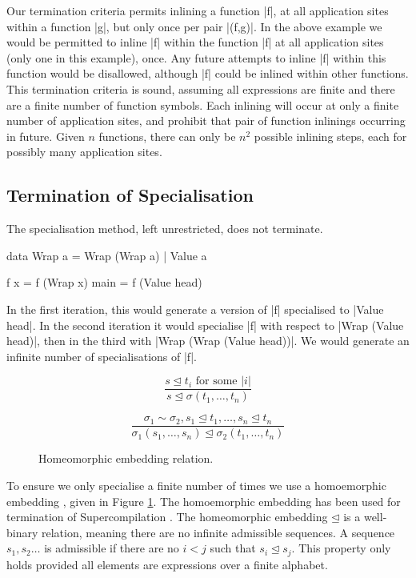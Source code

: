 \documentclass[preprint]{sigplanconf}
\begin{document}
Our termination criteria permits inlining a function |f|, at all application sites within a function |g|, but only once per pair |(f,g)|. In the above example we would be permitted to inline |f| within the function |f| at all application sites (only one in this example), once. Any future attempts to inline |f| within this function would be disallowed, although |f| could be inlined within other functions. This termination criteria is sound, assuming all expressions are finite and there are a finite number of function symbols. Each inlining will occur at only a finite number of application sites, and prohibit that pair of function inlinings occurring in future. Given $n$ functions, there can only be $n^2$ possible inlining steps, each for possibly many application sites.


\subsection{Termination of Specialisation}

The specialisation method, left unrestricted, does not terminate.

\begin{example}
\begin{code}
data Wrap a  =  Wrap (Wrap a)
             |  Value a

f x = f (Wrap x)
main = f (Value head)
\end{code}

In the first iteration, this would generate a version of |f| specialised to |Value head|. In the second iteration it would specialise |f| with respect to |Wrap (Value head)|, then in the third with |Wrap (Wrap (Value head))|. We would generate an infinite number of specialisations of |f|.
\end{example}

\begin{figure}
\[\frac{s \unlhd t_i \text{ for some } |i|}{s \unlhd \sigma(t_1,\ldots,t_n)} \]

\[\frac{\sigma_1 \sim \sigma_2,
        s_1 \unlhd t_1, \ldots , s_n \unlhd t_n}
       {\sigma_1 (s_1,\ldots,s_n) \unlhd \sigma_2 (t_1,\ldots,t_n)} \]
\caption{Homeomorphic embedding relation.}
\label{fig:homeomorphic}
\end{figure}

To ensure we only specialise a finite number of times we use a homoemorphic embedding \cite{homeomorphic}, given in Figure \ref{fig:homeomorphic}. The homoemorphic embedding has been used for termination of Supercompilation \cite{sorensen:supercompilation}. The homeomorphic embedding $\unlhd$ is a well-binary relation, meaning there are no infinite admissible sequences. A sequence $s_1,s_2 \ldots$ is admissible if there are no $i < j$ such that $s_i \unlhd s_j$. This property only holds provided all elements are expressions over a finite alphabet.
\end{document}
